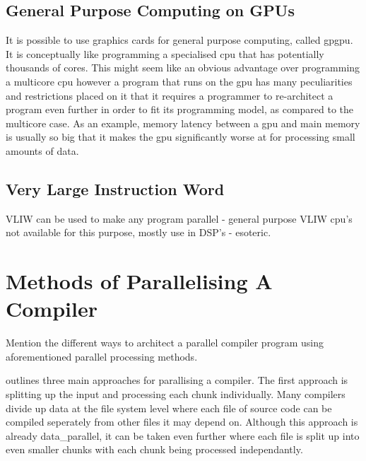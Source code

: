 \subsection{General Purpose Computing on GPUs}
It is possible to use graphics cards for general purpose computing, called
\gls{gpgpu}. It is conceptually like programming a specialised \gls{cpu} that has
potentially thousands of cores. This might seem like an obvious advantage over
programming a multicore \gls{cpu} however a program that runs on the \gls{gpu} has
many peculiarities and restrictions placed on it that it requires a programmer
to re-architect a program even further in order to fit its programming model, as
compared to the multicore case. As an example, memory latency between a \gls{gpu}
and main memory is usually so big that it makes the \gls{gpu} significantly worse
at for processing small amounts of data.

\subsection{Very Large Instruction Word}
\begin{sectionplan}
     VLIW can be used to make any program parallel - general purpose VLIW cpu's
not available for this purpose, mostly use in DSP's - esoteric.
\end{sectionplan}
\cite{fisher_parallel_2004}

\section{Methods of Parallelising A Compiler} \label{compiler_parallel_methods}
\begin{sectionplan}
    Mention the different ways to architect a parallel compiler program using
aforementioned parallel processing methods.
\cite{hillis_data_1986, gross_parallel_1989, jena_design_2018, baer_model_1977}
\end{sectionplan}

\cite{gross_parallel_1989} outlines three main approaches for parallising a
compiler. The first approach is splitting up the input and processing each chunk
individually. Many compilers divide up data at the file system level where each
file of source code can be compiled seperately from other files it may depend
on. Although this approach is already \gls{data_parallel}, it can be taken even
further where each file is split up into even smaller chunks with each chunk
being processed independantly.

